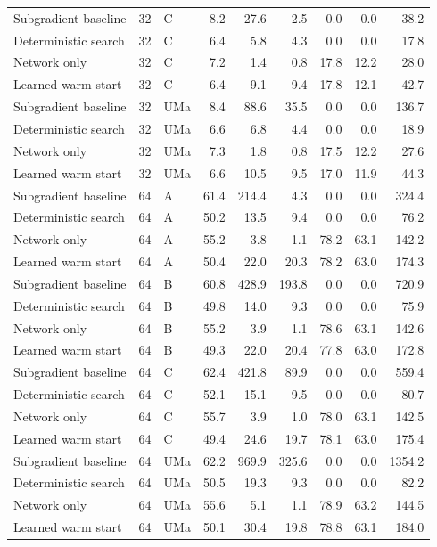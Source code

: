 \documentclass[10pt,letterpaper]{article}
\begin{document}
\begin{longtable}{lrlrrrrrr}
Subgradient baseline & 32 & C & 8.2 & 27.6 & 2.5 & 0.0 & 0.0 & 38.2\\
Deterministic search & 32 & C & 6.4 & 5.8 & 4.3 & 0.0 & 0.0 & 17.8\\
Network only & 32 & C & 7.2 & 1.4 & 0.8 & 17.8 & 12.2 & 28.0\\
Learned warm start & 32 & C & 6.4 & 9.1 & 9.4 & 17.8 & 12.1 & 42.7\\
Subgradient baseline & 32 & UMa & 8.4 & 88.6 & 35.5 & 0.0 & 0.0 & 136.7\\
Deterministic search & 32 & UMa & 6.6 & 6.8 & 4.4 & 0.0 & 0.0 & 18.9\\
Network only & 32 & UMa & 7.3 & 1.8 & 0.8 & 17.5 & 12.2 & 27.6\\
Learned warm start & 32 & UMa & 6.6 & 10.5 & 9.5 & 17.0 & 11.9 & 44.3\\
Subgradient baseline & 64 & A & 61.4 & 214.4 & 4.3 & 0.0 & 0.0 & 324.4\\
Deterministic search & 64 & A & 50.2 & 13.5 & 9.4 & 0.0 & 0.0 & 76.2\\
Network only & 64 & A & 55.2 & 3.8 & 1.1 & 78.2 & 63.1 & 142.2\\
Learned warm start & 64 & A & 50.4 & 22.0 & 20.3 & 78.2 & 63.0 & 174.3\\
Subgradient baseline & 64 & B & 60.8 & 428.9 & 193.8 & 0.0 & 0.0 & 720.9\\
Deterministic search & 64 & B & 49.8 & 14.0 & 9.3 & 0.0 & 0.0 & 75.9\\
Network only & 64 & B & 55.2 & 3.9 & 1.1 & 78.6 & 63.1 & 142.6\\
Learned warm start & 64 & B & 49.3 & 22.0 & 20.4 & 77.8 & 63.0 & 172.8\\
Subgradient baseline & 64 & C & 62.4 & 421.8 & 89.9 & 0.0 & 0.0 & 559.4\\
Deterministic search & 64 & C & 52.1 & 15.1 & 9.5 & 0.0 & 0.0 & 80.7\\
Network only & 64 & C & 55.7 & 3.9 & 1.0 & 78.0 & 63.1 & 142.5\\
Learned warm start & 64 & C & 49.4 & 24.6 & 19.7 & 78.1 & 63.0 & 175.4\\
Subgradient baseline & 64 & UMa & 62.2 & 969.9 & 325.6 & 0.0 & 0.0 & 1354.2\\
Deterministic search & 64 & UMa & 50.5 & 19.3 & 9.3 & 0.0 & 0.0 & 82.2\\
Network only & 64 & UMa & 55.6 & 5.1 & 1.1 & 78.9 & 63.2 & 144.5\\
Learned warm start & 64 & UMa & 50.1 & 30.4 & 19.8 & 78.8 & 63.1 & 184.0\\\end{longtable}\endgroup
\end{document}
